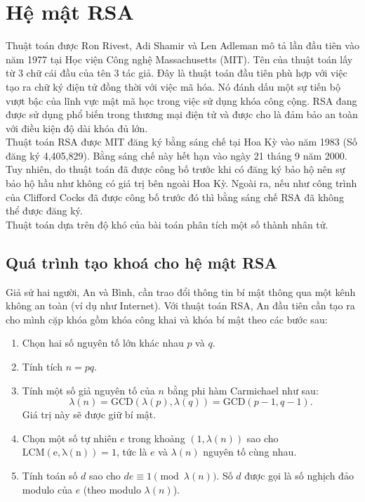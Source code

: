 \section{Hệ mật RSA}

Thuật toán được Ron Rivest, Adi Shamir và Len Adleman mô tả lần đầu tiên vào năm 1977 tại Học viện Công nghệ Massachusetts (MIT). Tên của thuật toán lấy từ 3 chữ cái đầu của tên 3 tác giả. Đây là thuật toán đầu tiên phù hợp với việc tạo ra chữ ký điện tử đồng thời với việc mã hóa. Nó đánh dấu một sự tiến bộ vượt bậc của lĩnh vực mật mã học trong việc sử dụng khóa công cộng. RSA đang được sử dụng phổ biến trong thương mại điện tử và được cho là đảm bảo an toàn với điều kiện độ dài khóa đủ lớn.\\

Thuật toán RSA được MIT đăng ký bằng sáng chế tại Hoa Kỳ vào năm 1983 (Số đăng ký 4,405,829). Bằng sáng chế này hết hạn vào ngày 21 tháng 9 năm 2000. Tuy nhiên, do thuật toán đã được công bố trước khi có đăng ký bảo hộ nên sự bảo hộ hầu như không có giá trị bên ngoài Hoa Kỳ. Ngoài ra, nếu như công trình của Clifford Cocks đã được công bố trước đó thì bằng sáng chế RSA đã không thể được đăng ký.\\

Thuật toán dựa trên độ khó của bài toán phân tích một số thành nhân tử.

\subsection{Quá trình tạo khoá cho hệ mật RSA}

Giả sử hai người, An và Bình, cần trao đổi thông tin bí mật thông qua một kênh không an toàn (ví dụ như Internet). Với thuật toán RSA, An đầu tiên cần tạo ra cho mình cặp khóa gồm khóa công khai và khóa bí mật theo các bước sau:
\begin{enumerate}
    \item Chọn hai số nguyên tố lớn khác nhau $p$ và $q$.
    \item Tính tích $n=pq$.
    \item Tính một số giả nguyên tố của $n$ bằng phi hàm Carmichael như sau:
    $$\lambda(n)=\mathrm{GCD}(\lambda(p),\lambda(q))=\mathrm{GCD}(p-1,q-1).$$
    Giá trị này sẽ được giữ bí mật.
    \item Chọn một số tự nhiên $e$ trong khoảng $(1,\lambda(n))$ sao cho $\mathrm{LCM(e,\lambda(n))}=1$, tức là $e$ và $\lambda(n)$ nguyên tố cùng nhau.
    \item Tính toán số $d$ sao cho $de\equiv1\pmod{\lambda(n)}$. Số $d$ được gọi là số nghịch đảo modulo của $e$ (theo modulo $\lambda(n)$).
\end{enumerate}

